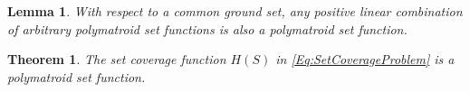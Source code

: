 \documentclass[letterpaper, 10 pt, conference]{ieeeconf}
\newcommand{\N}{\mathbb{N}}
\newtheorem{theorem}{Theorem}
\newtheorem{lemma}{Lemma}
\begin{document}
\begin{lemma}\label{Lm:LinearityOfSubmodularity}
With respect to a common ground set, any positive linear combination of arbitrary polymatroid set functions is also a polymatroid set function.    
\end{lemma}

\begin{theorem}\label{Th:SetCoverageSubmodularity}
The set coverage function $H(S)$ in \eqref{Eq:SetCoverageProblem} is a polymatroid set function.
\end{theorem}
\end{document}
